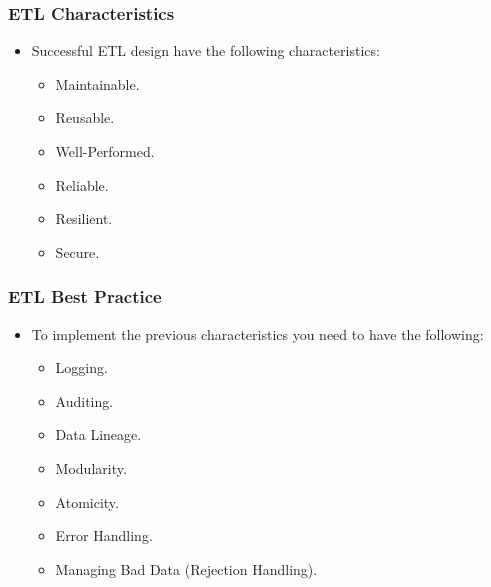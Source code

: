 \begin{frame}
    \frametitle{ETL Characteristics}
    \begin{itemize}[<+->]
        \item Successful ETL design have the following characteristics:
        \begin{itemize}[<+->]
            \item [\faCheckSquareO] Maintainable.
            \item [\faCheckSquareO] Reusable.
            \item [\faCheckSquareO] Well-Performed.
            \item [\faCheckSquareO] Reliable.
            \item [\faCheckSquareO] Resilient.
            \item [\faCheckSquareO] Secure.
        \end{itemize}
    \end{itemize}
\end{frame}

\begin{frame}
    \frametitle{ETL Best Practice}
    \begin{itemize}[<+->]
        \item To implement the previous characteristics you need to have the following:
        \begin{itemize}[<+->]
            \item [\faCheckSquareO] Logging.

            \item [\faCheckSquareO] Auditing.

            \item [\faCheckSquareO] Data Lineage.

            \item [\faCheckSquareO] Modularity.

            \item [\faCheckSquareO] Atomicity.

            \item [\faCheckSquareO] Error Handling.

            \item [\faCheckSquareO] Managing Bad Data (Rejection Handling).
        \end{itemize}
    \end{itemize}
\end{frame}


